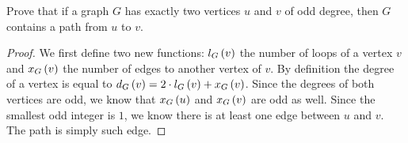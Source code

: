 \documentclass{article}
\begin{document}
\begin{exercise}
Prove that if a graph $G$ has exactly two vertices $u$ and $v$ of odd degree, then $G$ contains a path from $u$ to $v$.
\begin{answer}
\begin{proof}
We first define two new functions: $l_G\left( v \right)$ the number of loops of a vertex $v$ and $x_G\left( v \right)$ the number of edges to another vertex of $v$. By definition the degree of a vertex is equal to $d_G\left( v \right)=2\cdot l_G\left( v \right)+x_G\left( v \right)$. Since the degrees of both vertices are odd, we know that $x_G\left( u \right)$ and $x_G\left( v \right)$ are odd as well. Since the smallest odd integer is $1$, we know there is at least one edge between $u$ and $v$. The path is simply such edge.
\end{proof}
\end{answer}
\end{exercise}
\end{document}
